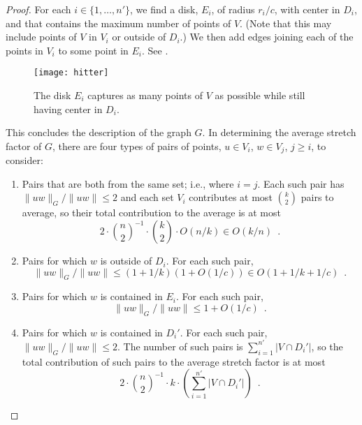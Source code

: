 \documentclass{patmorin}
\begin{document}
\begin{proof}
  For each $i\in\{1,\ldots,n'\}$, we find a disk, $E_i$, of radius
  $r_i/c$, with center in $D_i$, and that contains the maximum number
  of points of $V$.  (Note that this may include points of $V$ in $V_i$
  or outside of $D_i$.)  We then add edges joining each of the points
  in $V_i$ to some point in $E_i$.  See .

  \begin{figure}
    \begin{center}
      \texttt{[image: hitter]}
    \end{center}
    \caption{The disk $E_i$ captures as many points of $V$ as possible
     while still having center in $D_i$.}
  \end{figure}

  This concludes the description of the graph $G$.  In determining the
  average stretch factor of $G$, there are four types of pairs of points,
  $u\in V_i$, $w\in V_j$, $j\ge i$, to consider:
  \begin{enumerate}
    \item Pairs that are both from the same set; i.e., where $i=j$.  Each such
      pair has $\|uw\|_G/\|uw\|\le 2$ and each set $V_i$ contributes at
      most $\binom{k}{2}$ pairs to average, so their total contribution
      to the average is at most
      \[
        2\cdot\binom{n}{2}^{-1}\cdot\binom{k}{2}\cdot O(n/k) \in O(k/n)
        \enspace .
      \]
    \item Pairs for which $w$ is outside of $D_i$.  For each
      such pair, 
      \[
        \|uw\|_G/\|uw\|\le (1+1/k)(1+O(1/c)) \in O(1+1/k+1/c) \enspace .
      \]
    \item Pairs for which $w$ is contained in $E_i$.  For each
      such pair, 
      \[
        \|uw\|_G/\|uw\|\le 1+O(1/c) \enspace .
      \]
    \item Pairs for which $w$ is contained in $D_i'$.  For each
      such pair, $\|uw\|_G/\|uw\|\le 2$.  The number of such pairs is
      $\sum_{i=1}^{n'} |V\cap D_i'|$, so the total contribution of such
      pairs to the average stretch factor is at most
      \[
            2\cdot\binom{n}{2}^{-1}\cdot k\cdot\left(\sum_{i=1}^{n'} |V\cap D_i'|\right) \enspace .
      \]
  \end{enumerate}


\end{proof}
\end{document}
